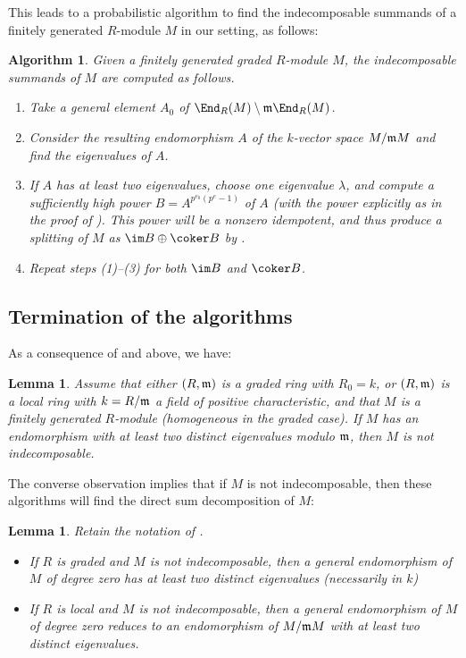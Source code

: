 \documentclass[12pt]{article}
\let\l\lambda
\theoremstyle{theorem}
\numberwithin{thm}{section}
\newtheorem{algm}[thm]{Algorithm}
\newtheorem{lem}[thm]{Lemma}
\theoremstyle{definition}
\begin{document}
This leads to a probabilistic algorithm to find the indecomposable summands of a finitely generated $R$-module $M$ in our setting, as follows:

\begin{algm}\label{alg:local}
  Given a finitely generated graded $R$-module $M$, the indecomposable summands of $M$ are computed as follows.
  \begin{enumerate}
  \item Take a general element $A_0$ of $\End_R(M) \setminus \m \End_R(M)$.
  \item Consider the resulting endomorphism $A$ of the $k$-vector space $M/\mathfrak m M$ and find the eigenvalues of $A$.
  \item If $A$ has at least two eigenvalues, choose one eigenvalue $\l$, and compute a sufficiently high power $B=A^{p^{e_0}(p^{e}-1)}$ of $A$ (with the power explicitly as in the proof of ). This power will be a nonzero idempotent, and thus produce a splitting of $M$ as $\im B \oplus \coker B$ by .
  \item Repeat steps (1)--(3) for both $\im B$ and $\coker B$.
  \end{enumerate}
\end{algm}

\subsection{Termination of the algorithms}

As a consequence of  and  above, we have:

\begin{lem}
  \label{lem:term}
  Assume that either $(R,\mathfrak m)$ is a graded ring with $R_0=k$, or $(R,\mathfrak m)$ is a local ring with $k=R/\mathfrak m$ a field of positive characteristic, and that $M$ is a finitely generated $R$-module (homogeneous in the graded case).
  If $M$ has an endomorphism with at least two distinct eigenvalues modulo $\mathfrak m$, then $M$ is not indecomposable.
\end{lem}

The converse observation implies that if $M$ is not indecomposable, then these algorithms will find the direct sum decomposition of $M$:

\begin{lem}
  \label{lem:distinct}
  Retain the notation of .
  \begin{itemize}
  \item If $R$ is graded and $M$ is not indecomposable, then a general endomorphism of $M$ of degree zero has at least two distinct eigenvalues (necessarily in $k$)
  \item If $R$ is local and $M$ is not indecomposable, then a general endomorphism of $M$ of degree zero reduces to an endomorphism of $M/\mathfrak m M$ with at least two distinct eigenvalues.
  \end{itemize}
\end{lem}
\end{document}
